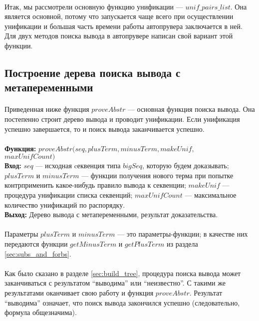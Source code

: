\documentclass{cw1}
\begin{document}
\paragraph{}
Итак, мы рассмотрели основную функцию унификации ---  $unif\!\_pairs\!\_list$. Она является основной,
потому что
запускается чаще всего при осуществлении унификации и большая часть времени работы автопрувера
заключается в ней. Для двух методов поиска вывода в автопрувере написан свой вариант этой функции.

\subsection{Построение дерева поиска вывода с метапеременными}
\label{sec:proveAbstr}
\paragraph{}
Приведенная ниже функция $proveAbstr$ --- основная функция поиска вывода. Она постепенно строит дерево вывода и
проводит унификации. Если унификация успешно завершается, то и поиск вывода
заканчивается успешно.
\\ \quad \\
\textbf{Функция:}
\textit{$prove\!Abstr(seq, plusTerm,minusTerm,makeUni\!f,$\\
            \phantom  \qquad \qquad \qquad \qquad $maxUnifCount)$}\\
\textbf{Вход: } $seq$ --- исходная cеквенция типа $bigSeq$, которую будем доказывать;
$plusT\!erm$ и $minusT\!erm$ --- функции получения нового терма при попытке контрприменить
какое-нибудь правило вывода к секвенции; $makeU\!ni\!f$ --- процедура унификации списка секвенций;
$maxU\!nif\!Count$ --- максимальное количество унификаций по распорядку.\\
\textbf{Выход:} Дерево вывода с метапеременными, результат доказательства.

\paragraph{}
Параметры $plusTerm$ и $minusTerm$ --- это параметры-функции; в качестве них передаются
функции $getMinusTerm$ и $getPlusTerm$ из раздела \ref{sec:subs_and_forbs}.
%
\paragraph{}
Как было сказано в разделе \ref{sec:build_tree}, процедура поиска вывода может заканчиваться с
результатом ``выводима'' или ``неизвестно''. С такими же результатами оканчивает свою работу и функция
$proveAbstr$. Результат ``выводима'' означает, что поиск вывода
закончился успешно (следовательно, формула общезначима).
\end{document}
